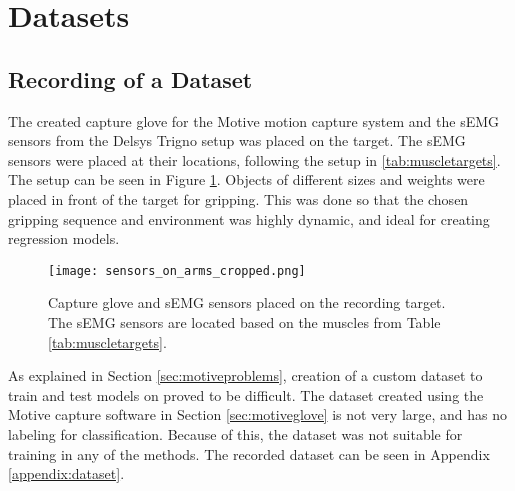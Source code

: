 \documentclass[../main.tex]{subfiles}
\begin{document}




\section{Datasets}

\subsection{Recording of a Dataset}

The created capture glove for the Motive motion capture system and the sEMG sensors from the Delsys Trigno setup was placed on the target.
The sEMG sensors were placed at their locations, following the setup in \ref{tab:muscletargets}.
The setup can be seen in Figure \ref{fig:musclesensorsonarm}.
Objects of different sizes and weights were placed in front of the target for gripping. 
This was done so that the chosen gripping sequence and environment was highly dynamic, and ideal for creating regression models.

\begin{figure}[H]
\begin{center}
\texttt{[image: sensors\_on\_arms\_cropped.png]}
\caption{Capture glove and sEMG sensors placed on the recording target. The sEMG sensors are located based on the muscles from Table \ref{tab:muscletargets}.}
\label{fig:musclesensorsonarm}
\end{center}
\end{figure}

As explained in Section \ref{sec:motiveproblems}, creation of a custom dataset to train and test models on proved to be difficult.
The dataset created using the Motive capture software in Section \ref{sec:motiveglove} is not very large, and has no labeling for classification.
Because of this, the dataset was not suitable for training in any of the methods.
The recorded dataset can be seen in Appendix \ref{appendix:dataset}. 
\end{document}
